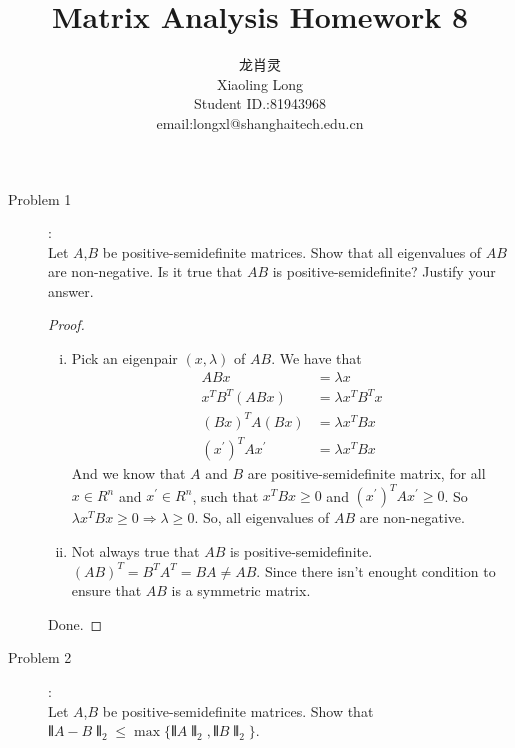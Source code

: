 \documentclass[a4paper]{article}
\title{Matrix Analysis Homework 8}
\author{龙肖灵 \\Xiaoling Long\\Student ID.:81943968\\email:longxl@shanghaitech.edu.cn}
\begin{document}
\maketitle

\begin{description}
  \item[Problem 1]:\\
  Let $A$,$B$ be positive-semidefinite matrices. Show that all eigenvalues of $AB$ are non-negative.
   Is it true that $AB$ is positive-semidefinite? Justify your answer.

  \begin{proof}\
    \begin{enumerate}[i)]
      \item
      Pick an eigenpair $(x,\lambda)$ of $AB$. We have that
      \begin{align*}
        ABx&=\lambda x\\
        x^{T}B^{T}(ABx)&=\lambda x^{T}B^{T}x\\
        (Bx)^{T}A(Bx)&=\lambda x^{T}Bx\\
        (x^{\prime})^{T}Ax^{\prime}&=\lambda x^{T}Bx
      \end{align*}
      And we know that $A$ and $B$ are positive-semidefinite matrix, for all $x\in R^{n}$ and $x^{\prime}\in R^{n}$, such that $x^{T}Bx\ge 0$ and $(x^{\prime})^{T}Ax^{\prime}\ge 0$. So $\lambda x^{T}Bx \ge 0\Rightarrow \lambda\ge 0$.
      So, all eigenvalues of $AB$ are non-negative.
      \item Not always true that $AB$ is positive-semidefinite. $(AB)^{T}=B^{T}A^{T}=BA\ne AB$. Since there isn't enought condition to ensure that $AB$ is a symmetric matrix.
    \end{enumerate}
    Done.
  \end{proof}

  \item[Problem 2]:\\
   Let $A$,$B$ be positive-semidefinite matrices. Show that $\interleave A-B\interleave _{2}\le \max\{\interleave A\interleave_{2},\interleave B\interleave_{2}\}$.


\end{description}
\end{document}
